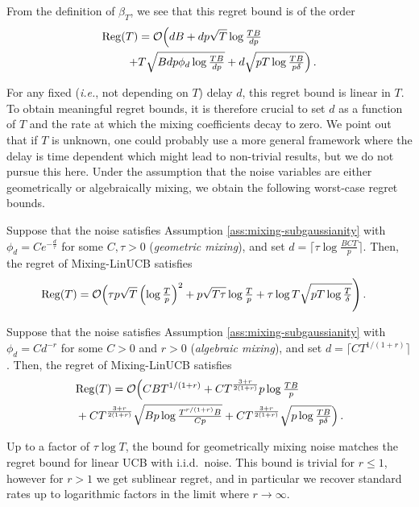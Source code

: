 From the definition of $\beta_T$, we see that this regret bound is of the order
\begin{align*}
\mathrm{Reg}(T)  &= \mathcal{O}\Big(dB + dp\sqrt{T}\log\tfrac{TB}{dp} \\+& T\sqrt{Bdp\phi_d\log\tfrac{TB}{dp}} + d\sqrt{pT\log\tfrac{TB}{p\delta}}\Big)\,.
\end{align*}

For any fixed (\emph{i.e.}, not depending on $T$) delay $d$, this regret bound is linear in $T$. To obtain meaningful regret bounds, it is therefore crucial to set $d$ as a function of $T$ and the rate at which the mixing coefficients decay to zero. We point out that if $T$ is unknown, one could probably use a more general framework where the delay is time dependent which might lead to non-trivial results, but we do not pursue this here. Under the assumption that the noise variables are either geometrically or algebraically mixing, we obtain the following worst-case regret bounds.

\begin{corollary}
\label{cor:geometric_mixing}
Suppose that the noise satisfies Assumption \ref{ass:mixing-subgaussianity} with $\phi_d=Ce^{-\frac{d}{\tau}}$ for some $C,\tau >0$ (\emph{geometric mixing}), and set $d = \lceil \tau\log\tfrac{BCT}{p}\rceil$. Then, the regret of Mixing-LinUCB satisfies
\begin{align*}
&\mathrm{Reg}(T) = \mathcal{O}\Big(\tau p\sqrt{T}\left(\log \tfrac{T}{p}\right)^2  +p\sqrt{T\tau}\log \tfrac{T}{p} + \tau\log T\sqrt{pT\log\tfrac{T}{\delta}}\Bigg)\,.
\end{align*}

\end{corollary}

\begin{corollary}
Suppose that the noise satisfies Assumption \ref{ass:mixing-subgaussianity} with $\phi_d=Cd^{-r}$ for some $C>0$ and $r >0$ (\emph{algebraic mixing}), and set $d=\lceil CT^{1/(1+r)}\rceil$. Then, the regret of Mixing-LinUCB satisfies
\begin{align*}
&\mathrm{Reg}(T) =\mathcal{O}\Big(CBT^{1/(1+r)} + CT^{\frac{3+r}{2(1+r)}}p\log\tfrac{TB}{p} \\&+ CT^{\frac{3+r}{2(1+r)}}\sqrt{Bp\log\tfrac{T^{r/(1+r)}B}{Cp}} + CT^{\frac{3+r}{2(1+r)}}\sqrt{p\log\tfrac{TB}{p\delta}}\Big)\,.
\end{align*}
\label{cor:algebraic_mixing}
\end{corollary}

Up to a factor of $\tau\log T$, the bound for geometrically mixing noise matches the regret bound for linear UCB with i.i.d.~noise. This bound is trivial for $r\leq 1$, however for $r>1$ we get sublinear regret, and in particular we recover standard rates up to logarithmic factors in the limit where $r \to \infty.$

